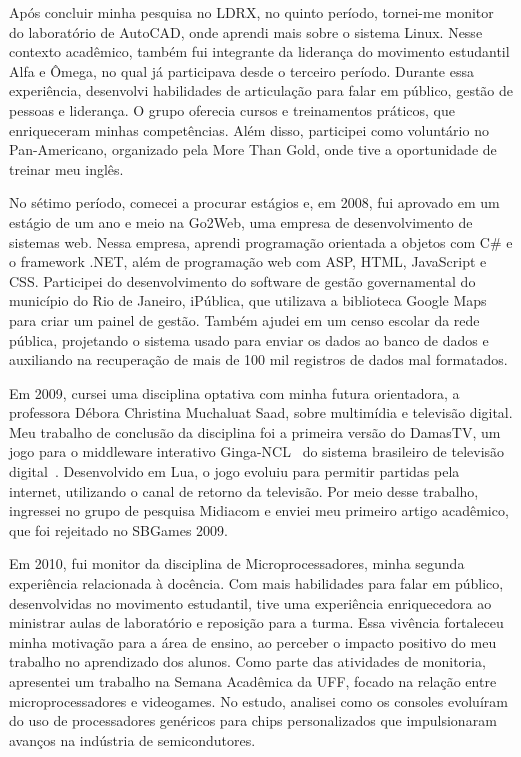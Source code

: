 \documentclass[10pt,a4paper,oneside]{book}
\begin{document}
Após concluir minha pesquisa no LDRX, no quinto período, tornei-me monitor do laboratório de AutoCAD, onde aprendi mais
sobre o sistema Linux. Nesse contexto acadêmico, também fui integrante da liderança do movimento estudantil Alfa e Ômega,
no qual já participava desde o terceiro período. Durante essa experiência, desenvolvi habilidades de articulação para
falar em público, gestão de pessoas e liderança. O grupo oferecia cursos e treinamentos práticos, que enriqueceram
minhas competências. Além disso, participei como voluntário no Pan-Americano, organizado pela More Than Gold, onde
tive a oportunidade de treinar meu inglês.

No sétimo período, comecei a procurar estágios e, em 2008, fui aprovado em um estágio de um ano e meio na Go2Web, uma
empresa de desenvolvimento de sistemas web. Nessa empresa, aprendi programação orientada a objetos com C\# e o framework
.NET, além de programação web com ASP, HTML, JavaScript e CSS. Participei do desenvolvimento do software de gestão
governamental do município do Rio de Janeiro, iPública, que utilizava a biblioteca Google Maps para criar um painel
de gestão. Também ajudei em um censo escolar da rede pública, projetando o sistema usado para enviar os dados ao banco
de dados e auxiliando na recuperação de mais de 100 mil registros de dados mal formatados.

Em 2009, cursei uma disciplina optativa com minha futura orientadora, a professora Débora Christina Muchaluat Saad,
sobre multimídia e televisão digital. Meu trabalho de conclusão da disciplina foi a primeira versão do DamasTV, um jogo
para o middleware interativo Ginga-NCL~\cite{soares2007ginga} do sistema brasileiro de televisão
digital~\cite{mendes2007sbtvd}. Desenvolvido em Lua, o jogo evoluiu para permitir partidas pela internet, utilizando o
canal de retorno da televisão. Por meio desse trabalho, ingressei no grupo de pesquisa Midiacom e enviei meu primeiro
artigo acadêmico, que foi rejeitado no SBGames 2009.

Em 2010, fui monitor da disciplina de Microprocessadores, minha segunda experiência relacionada à docência.
Com mais habilidades para falar em público, desenvolvidas no movimento estudantil, tive uma experiência enriquecedora ao
ministrar aulas de laboratório e reposição para a turma. Essa vivência fortaleceu minha motivação para a área de ensino,
ao perceber o impacto positivo do meu trabalho no aprendizado dos alunos. Como parte das atividades de monitoria,
apresentei um trabalho na Semana Acadêmica da UFF, focado na relação entre microprocessadores e videogames. No estudo,
analisei como os consoles evoluíram do uso de processadores genéricos para chips personalizados que impulsionaram avanços
na indústria de semicondutores.
\end{document}
